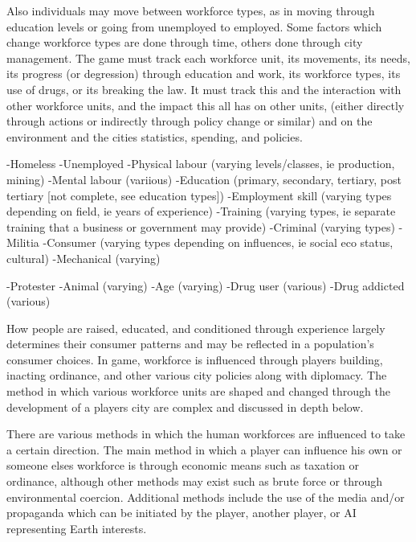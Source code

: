 Also individuals may move between workforce types, as in moving through education levels or going from unemployed to employed. Some factors which change workforce types are done through time, others done through city management. The game must track each workforce unit, its movements, its needs, its progress (or degression) through education and work, its workforce types, its use of drugs, or its breaking the law. It must track this and the interaction with other workforce units, and the impact this all has on other units, (either directly through actions or indirectly through policy change or similar) and on the environment and the cities statistics, spending, and policies.


-Homeless
-Unemployed
-Physical labour (varying levels/classes, ie production, mining)
-Mental labour (variious)
-Education (primary, secondary, tertiary, post tertiary [not complete, see education types])
-Employment skill (varying types depending on field, ie years of experience)
-Training (varying types, ie separate training that a business or government may provide)
-Criminal (varying types)
-Militia
-Consumer (varying types depending on influences, ie social eco status, cultural)
-Mechanical (varying) 

-Protester
-Animal (varying)
-Age (varying)
-Drug user (various)
-Drug addicted (various)







%
How people are raised, educated, and conditioned through experience largely determines their consumer patterns and may be reflected in a population's consumer choices. In game, workforce is influenced through players building, inacting ordinance, and other various city policies along with diplomacy. The method in which various workforce units are shaped and changed through the development of a players city are complex and discussed in depth below.
%

There are various methods in which the human workforces are influenced to take a certain direction. The main method in which a player can influence his own or someone elses workforce is through economic means such as taxation or ordinance, although other methods may exist such as brute force or through environmental coercion. Additional methods include the use of the media and/or propaganda which can be initiated by the player, another player, or AI representing Earth interests.

